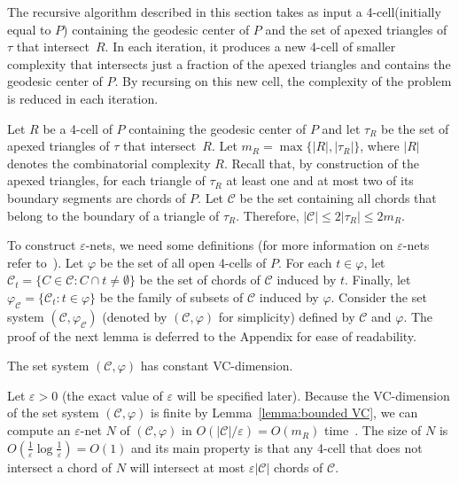 \documentclass[a4paper,UKenglish]{lipics}
\newcommand{\m}{\ensuremath{m_{\scriptscriptstyle R}}}
\newcommand{\tcell}{4-cell\xspace}
\newcommand{\tcells}{4-cells\xspace}
\begin{document}
The recursive algorithm described in this section takes as input a \tcell (initially equal to $P$) containing the geodesic center of $P$ and the set of apexed triangles of $\tau$ that intersect~$R$. In each iteration, it produces a new \tcell of smaller complexity that intersects just a fraction of the apexed triangles and contains the geodesic center of $P$. By recursing on this new cell, the complexity of the problem is reduced in each iteration.

Let $R$ be a \tcell of $P$ containing the geodesic center of $P$ and let $\tau_R$ be the set of apexed triangles of $\tau$ that intersect~$R$. 
Let $\m = \max\{|R|, |\tau_R|\}$, where $|R|$ denotes the combinatorial complexity $R$.
Recall that, by construction of the apexed triangles, for each triangle of $\tau_R$ at least one and at most two of its boundary segments are chords of $P$.
Let $\mathcal C$ be the set containing all chords that belong to the boundary of a triangle of $\tau_R$. 
Therefore, $|\mathcal C| \leq 2|\tau_R|\leq 2\m$.

To construct $\varepsilon$-nets, we need some definitions (for more information on $\varepsilon$-nets refer to~\cite{ConstructionEpsilonNets}).
Let $\varphi$ be the set of all open \tcells of $P$.
For each $t\in \varphi$, let $\mathcal C_t = \{C\in \mathcal C: C\cap t \neq \emptyset\}$ be the set of chords of $\mathcal C$ induced by $t$. 
Finally, let $\varphi_\mathcal C = \{\mathcal C_t : t\in \varphi\}$ be the family of subsets of $\mathcal C$ induced by $\varphi$.
Consider the set system $(\mathcal C, \varphi_\mathcal C)$ (denoted by $(\mathcal C, \varphi)$ for simplicity) defined by $\mathcal C$ and $\varphi$. 
The proof of the next lemma is deferred to the Appendix for ease of readability.

\begin{lemma}\label{lemma:bounded VC}
The set system $(\mathcal C, \varphi)$ has constant VC-dimension.
\end{lemma}

Let $\varepsilon >0$ (the exact value of $\varepsilon$ will be specified later).
Because the VC-dimension of the set system $(\mathcal C, \varphi)$ is finite by Lemma~\ref{lemma:bounded VC}, we can compute an $\varepsilon$-net $N$ of $(\mathcal C, \varphi)$ in $O(|\mathcal C|/\varepsilon) = O(\m)$ time~\cite{ConstructionEpsilonNets}. 
The size of $N$ is $O(\frac{1}{\varepsilon} \log \frac{1}{\varepsilon}) = O(1)$ and its main property is that any \tcell that does not intersect a chord of $N$ will intersect at most $\varepsilon |\mathcal C|$ chords of $\mathcal C$. 
\end{document}
